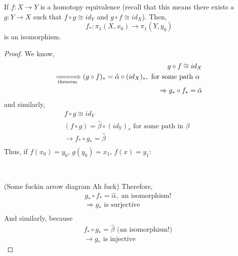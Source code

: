 \documentclass[../notes.tex]{subfiles}
\begin{document}
    \begin{corollary}
        If $f: X\rightarrow Y$ is a homotopy equivalence
        (recall that this means there exists a $g:Y\rightarrow X$ such that 
        $f\circ g\cong id_Y$ and $g\circ f\cong id_X$). Then,
        \[
            f_*: \pi_1(X,x_0)\rightarrow \pi_1(Y,y_0)
        \]
        is an isomorphism.
        \begin{proof}
            We know,
            \begin{align*}
                g\circ f \cong id_X\\
                \xRightarrow[\text{theorem}]\ (g\circ f)_*
                =\hat{\alpha}\circ (id_X)_*, \text{ for some path $\alpha $ }\\
                \Rightarrow g_*\circ f_* = \hat{\alpha}\\
            \end{align*}
            and similarly,
            \begin{align*}
                f\circ g\cong id_Y\\
                (f\circ g) = \hat{\beta}\circ (id_Y)_* \text{ for some path in $\beta $ }\\
                \rightarrow f_* \circ g_* = \hat{\beta}\\
            \end{align*}
            Thus, if $f(x_0)=y_0$, $g(y_0)=x_1$, $f(x)=y_1$:\\
            \begin{center}
                \\
            \end{center}
            (Some fuckin arrow diagram Ah fuck)
            Therefore,
            \begin{align*}
                g_*\circ f_* = \hat{\alpha}, \text{ an isomorphism! }\\
                \Rightarrow g_* \text{ is surjective}\\
            \end{align*}
            And similarly, because
            \begin{align*}
                f_*\circ g_* = \hat{\beta} \text{ (an isomorphism!) }\\
                \rightarrow g_* \text{ is injective}
            \end{align*}
        \end{proof}
    \end{corollary}
\end{document}
